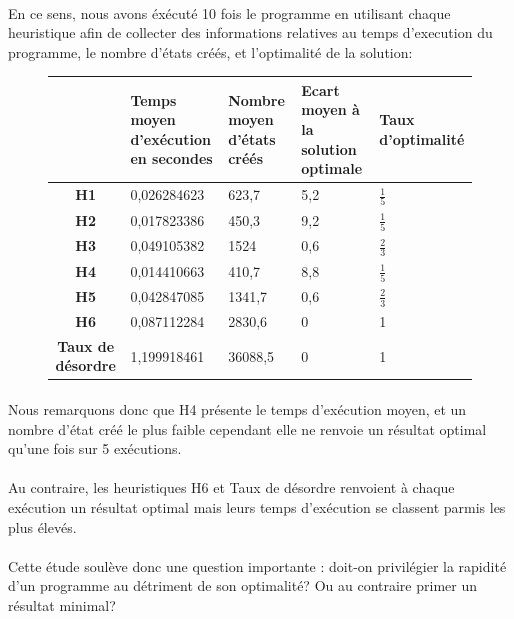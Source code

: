 \documentclass[10pt,a4paper]{report}
\begin{document}
\paragraph{}{En ce sens, nous avons éxécuté 10 fois le programme en utilisant chaque heuristique afin de collecter des informations relatives au temps d'execution du programme, le nombre d'états créés, et l'optimalité de la solution: }
{\scriptsize{}
\renewcommand{\arraystretch}{1.3}
\vspace*{1cm}
\begin{figure}[h!]
\centering
\begin{tabular}
{| c || p{} | p{3cm} | p{3cm} | p{3cm} |} \hline \textbf{ } & \textbf{Temps moyen d'exécution en secondes }&
 \textbf{Nombre moyen d'états créés} & \textbf{Ecart moyen à la solution optimale} &
  \textbf{Taux d'optimalité} \\ \hline \hline
\textbf{H1} & 0,026284623 & 623,7 & 5,2 & $\frac{1}{5}$ \\ \hline
\textbf{H2} & 0,017823386 & 450,3 & 9,2 & $\frac{1}{5}$   \\ \hline
\textbf{H3}& 0,049105382 & 1524 & 0,6 & $\frac{2}{3}$ \\ \hline
\textbf{H4} & 0,014410663 & 410,7 & 8,8 & $\frac{1}{5}$ \\ \hline
\textbf{H5} & 0,042847085 & 1341,7 & 0,6 & $\frac{2}{3}$  \\ \hline
\textbf{H6} & 0,087112284 & 2830,6 & 0 & 1  \\ \hline
\textbf{Taux de désordre} & 1,199918461 & 36088,5 & 0& 1 \\ \hline
\end{tabular}

\end{figure} \vspace*{1cm}}
\paragraph{}{Nous remarquons donc que H4 présente le temps d'exécution moyen, et un nombre d'état créé le plus faible cependant elle ne renvoie un résultat optimal qu'une fois sur 5 exécutions.}

\paragraph{}{Au contraire, les heuristiques H6 et Taux de désordre renvoient à chaque exécution un résultat optimal mais leurs temps d'exécution se classent parmis les plus élevés.}

\paragraph{}{Cette étude soulève donc une question importante : doit-on privilégier la rapidité d'un programme au détriment de son optimalité? Ou au contraire primer un résultat minimal?}
\end{document}

